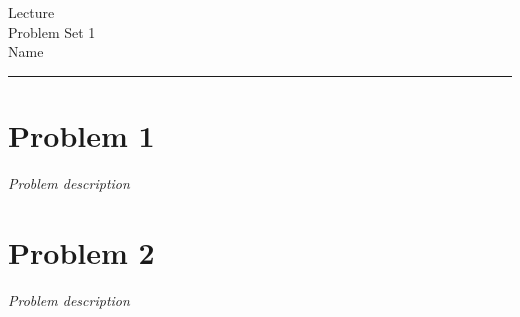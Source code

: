 \documentclass[12pt,letterpaper]{article}
\newcommand{\myname}{Name}
\newcommand{\mylecture}{Lecture}
\newcommand{\myproblemset}{Problem Set 1}
\numberwithin{equation}{section}
\begin{document}
\thispagestyle{plain}

\begin{center}
	{\LARGE \mylecture} \\
	{\large \myproblemset} \\
	{\large \myname}
\end{center}

\hrule height 0.5pt

\section*{Problem 1}

\textit{Problem description}

\newpage

\section*{Problem 2}
\textit{Problem description}
\end{document}
